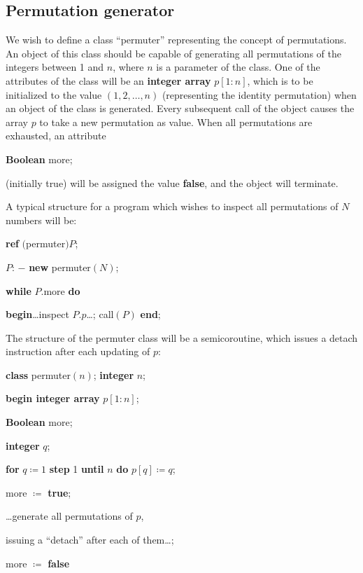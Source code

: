 \documentclass[twoside,11pt]{book}
\begin{document}
\subsection{Permutation generator}

We wish to define a class ``permuter'' representing the concept of permutations. An object of this class should be capable of generating all permutations of the integers between 1 and $n$, where $n$ is a parameter of the class. One of the attributes of the class will be an \textbf{integer array} $p[1:n]$, which is to be initialized to the value $(1, 2, \dots, n)$ (representing the identity permutation) when an object of the class is generated. Every subsequent call of the object
causes the array $p$ to take a new permutation as value. When all permutations are exhausted, an attribute 

\quad \textbf{Boolean} more;

\noindent
(initially true) will be assigned the value \textbf{false}, and the object will terminate.

A typical structure for a program which wishes to inspect all permutations of $N$ numbers will be:

\quad \textbf{ref} $($permuter$)P$;

\quad $P$: $-$ \textbf{new} permuter$(N)$;

\quad \textbf{while} $P$.more \textbf{do}

\quad \quad \textbf{begin}\dots inspect $P.p$\dots; call$(P)$ \textbf{end};

\noindent
The structure of the permuter class will be a semicoroutine, which issues a detach instruction after each updating of $p$:

\quad \textbf{class} permuter$(n)$; \textbf{integer} $n$;

\quad \quad \textbf{begin integer array} $p[1:n]$;

\quad \quad \quad \textbf{Boolean} more;

\quad \quad \quad \textbf{integer} $q$;

\quad \quad \quad \textbf{for} $q\coloneq 1$ \textbf{step} 1 \textbf{until} $n$ \textbf{do} $p[q]\coloneq q$;

\quad \quad \quad more $\coloneq$ \textbf{true};

\tabto*{3.3em} \dots generate all permutations of $p$,

\quad \quad \quad issuing a ``detach'' after each of them\dots;

\quad \quad \quad more $\coloneq$ \textbf{false}
\end{document}
